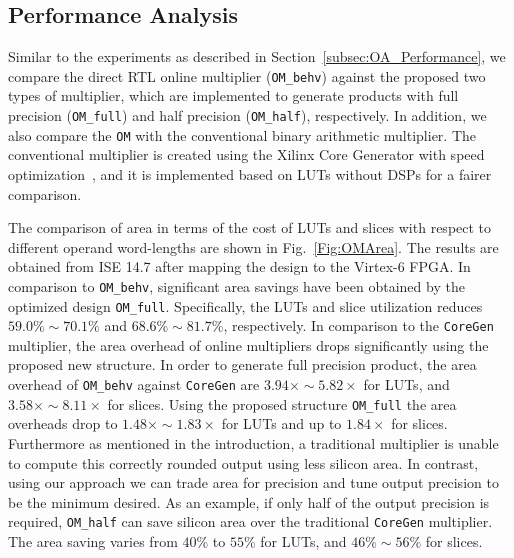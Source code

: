 \documentclass[conference]{IEEEtran}
\begin{document}
\subsection{Performance Analysis}
Similar to the experiments as described in Section~\ref{subsec:OA_Performance}, we compare the direct RTL online multiplier (\texttt{OM\_behv}) against the proposed two types of multiplier, which are implemented to generate products with full precision (\texttt{OM\_full}) and half precision (\texttt{OM\_half}), respectively. In addition, we also compare the \texttt{OM} with the conventional binary arithmetic multiplier. The conventional multiplier is created using the Xilinx Core Generator with speed optimization~\cite{XilinxMult}, and it is implemented based on LUTs without DSPs for a fairer comparison.

The comparison of area in terms of the cost of LUTs and slices with respect to different operand word-lengths are shown in Fig.~\ref{Fig:OMArea}. The results are obtained from ISE 14.7 after mapping the design to the Virtex-6 FPGA. In comparison to \texttt{OM\_behv}, significant area savings have been obtained by the optimized design \texttt{OM\_full}. Specifically, the LUTs and slice utilization reduces $59.0\%\sim70.1\%$ and $68.6\%\sim81.7\%$, respectively. In comparison to the \texttt{CoreGen} multiplier, the area overhead of online multipliers drops significantly using the proposed new structure. In order to generate full precision product, the area overhead of \texttt{OM\_behv} against \texttt{CoreGen} are $3.94\times\sim5.82\times$ for LUTs, and $3.58\times\sim8.11\times$ for slices. Using the proposed structure \texttt{OM\_full} the area overheads drop to $1.48\times\sim1.83\times$ for LUTs and up to $1.84\times$ for slices. Furthermore as mentioned in the introduction, a traditional multiplier is unable to compute this correctly rounded output using less silicon area. In contrast, using our approach we can trade area for precision and tune output precision to be the minimum desired. As an example, if only half of the output precision is required, \texttt{OM\_half} can save silicon area over the traditional \texttt{CoreGen} multiplier. The area saving varies from $40\%$ to $55\%$ for LUTs, and $46\%\sim56\%$ for slices.

\end{document}
